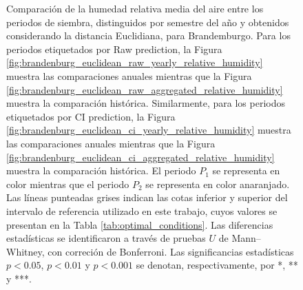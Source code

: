 \begin{figure}[htbp]
	\caption{
		Comparación de la humedad relativa media del aire entre los periodos de siembra, distinguidos por semestre del año y obtenidos considerando la distancia Euclidiana, para Brandemburgo. Para los periodos etiquetados por Raw prediction, la Figura \ref{fig:brandenburg_euclidean_raw_yearly_relative_humidity} muestra las comparaciones anuales mientras que la Figura \ref{fig:brandenburg_euclidean_raw_aggregated_relative_humidity} muestra la comparación histórica. Similarmente, para los periodos etiquetados por CI prediction, la Figura \ref{fig:brandenburg_euclidean_ci_yearly_relative_humidity} muestra las comparaciones anuales mientras que la Figura \ref{fig:brandenburg_euclidean_ci_aggregated_relative_humidity} muestra la comparación histórica. El periodo $P_1$ se representa en color mientras que el periodo $P_2$ se representa en color anaranjado. Las líneas punteadas grises indican las cotas inferior y superior del intervalo de referencia utilizado en este trabajo, cuyos valores se presentan en la Tabla \ref{tab:optimal_conditions}. Las diferencias estadísticas se identificaron a través de pruebas $U$ de Mann--Whitney, con correción de Bonferroni. Las significancias estadísticas $p<0.05$, $p<0.01$ y $p<0.001$ se denotan, respectivamente, por *, ** y ***.
	}
	\label{fig:brandenburg_euclidean_relative_humidity}
	
	
\end{figure}



